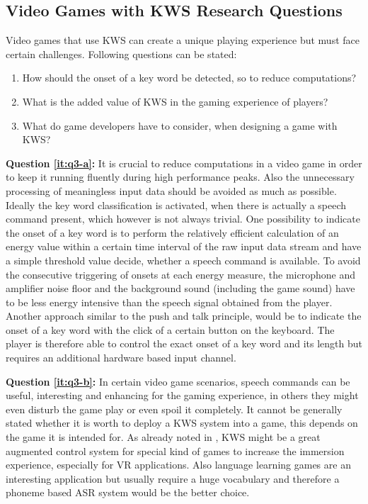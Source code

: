 \subsection{Video Games with KWS Research Questions}\label{sec:intro_rq_games}
Video games that use KWS can create a unique playing experience but must face certain challenges.
Following questions can be stated:
\begin{enumerate}[label={Q.3.\alph*)}, leftmargin=1.75cm]
  \item How should the onset of a key word be detected, so to reduce computations?\label{it:q3-a}
  \item What is the added value of KWS in the gaming experience of players?\label{it:q3-b}
  \item What do game developers have to consider, when designing a game with KWS?\label{it:q3-c}
\end{enumerate}
\noindent
\textbf{Question \ref{it:q3-a}:} 
It is crucial to reduce computations in a video game in order to keep it running fluently during high performance peaks.
Also the unnecessary processing of meaningless input data should be avoided as much as possible.
Ideally the key word classification is activated, when there is actually a speech command present, which however is not always trivial.
One possibility to indicate the onset of a key word is to perform the relatively efficient calculation of an energy value within a certain time interval of the raw input data stream and have a simple threshold value decide, whether a speech command is available. 
To avoid the consecutive triggering of onsets at each energy measure, the microphone and amplifier noise floor and the background sound (including the game sound) have to be less energy intensive than the speech signal obtained from the player.
Another approach similar to the push and talk principle, would be to indicate the onset of a key word with the click of a certain button on the keyboard.
The player is therefore able to control the exact onset of a key word and its length but requires an additional hardware based input channel.

\textbf{Question \ref{it:q3-b}:}
In certain video game scenarios, speech commands can be useful, interesting and enhancing for the gaming experience, in others they might even disturb the game play or even spoil it completely.
It cannot be generally stated whether it is worth to deploy a KWS system into a game, this depends on the game it is intended for.
As already noted in , KWS might be a great augmented control system for special kind of games to increase the immersion experience, especially for VR applications.
Also language learning games are an interesting application but usually require a huge vocabulary and therefore a phoneme based ASR system would be the better choice.


